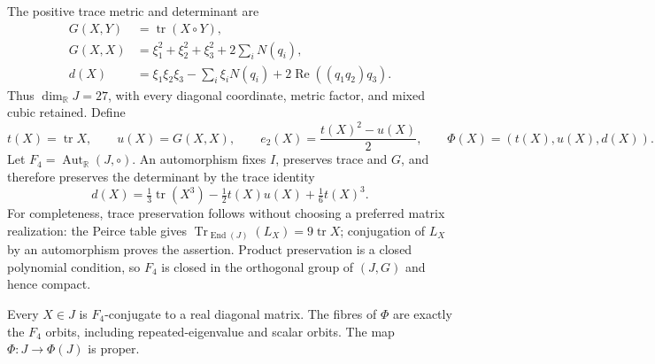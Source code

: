 The positive trace metric and determinant are
\begin{equation}
 \begin{split}
 G(X,Y)&=\operatorname{tr}(X\circ Y),\\
 G(X,X)&=\xi_1^2+\xi_2^2+\xi_3^2+2\sum_iN(q_i),\\
 d(X)&=\xi_1\xi_2\xi_3-\sum_i\xi_iN(q_i)
              +2\operatorname{Re}((q_1q_2)q_3).
 \end{split}
 \label{h24:ocb:eq:metric-determinant}\tag{OCB2}
\end{equation}
Thus $\dim_{\mathbb R}J=27$, with every diagonal coordinate, metric
factor, and mixed cubic retained. Define
\begin{equation}
 t(X)=\operatorname{tr}X,\qquad u(X)=G(X,X),\qquad
 e_2(X)=\frac{t(X)^2-u(X)}2,\qquad
 \Phi(X)=(t(X),u(X),d(X)).
 \label{h24:ocb:eq:invariants}\tag{OCB3}
\end{equation}
Let $F_4=\operatorname{Aut}_{\mathbb R}(J,\circ)$. An automorphism
fixes $I$, preserves trace and $G$, and therefore preserves the
determinant by the trace identity
\begin{equation}
 d(X)=\tfrac13\operatorname{tr}(X^3)
 -\tfrac12t(X)u(X)+\tfrac16t(X)^3.
 \label{h24:ocb:eq:trace-determinant}\tag{OCB4}
\end{equation}
For completeness, trace preservation follows without choosing a
preferred matrix realization: the Peirce table gives
$\operatorname{Tr}_{\operatorname{End}(J)}(L_X)=9\operatorname{tr}X$;
conjugation of $L_X$ by an automorphism proves the assertion. Product
preservation is a closed polynomial condition, so $F_4$ is closed in the
orthogonal group of $(J,G)$ and hence compact.

\begin{proposition}
\label{h24:ocb:prop:invariant-fibres}
Every $X\in J$ is $F_4$-conjugate to a real diagonal matrix. The fibres
of $\Phi$ are exactly the $F_4$ orbits, including repeated-eigenvalue
and scalar orbits. The map $\Phi:J\to\Phi(J)$ is proper.
\end{proposition}

